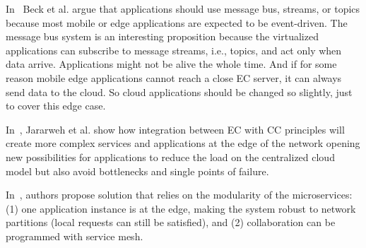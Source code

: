 In~\cite{inproceedingsBeck} Beck et al. argue that applications should use message bus, streams, or topics because most mobile or edge applications are expected to be event-driven. The message bus system is an interesting proposition because the virtualized applications can subscribe to message streams, i.e., topics, and act only when data arrive. Applications might not be alive the whole time. And if for some reason mobile edge applications cannot reach a close EC server, it can always send data to the cloud. So cloud applications should be changed so slightly, just to cover this edge case.

In~\cite{JararwehDAAAB16}, Jararweh et al. show how integration between EC with CC principles will create more complex services and applications at the edge of the network opening new possibilities for applications to reduce the load on the centralized cloud model but also avoid bottlenecks and single points of failure.

In~\cite{cherrueau}, authors propose solution that relies on the modularity of the microservices: (1) one application instance is at the edge, making the system robust to network partitions (local requests can still be satisfied), and (2) collaboration can be programmed with service mesh.
%
%
